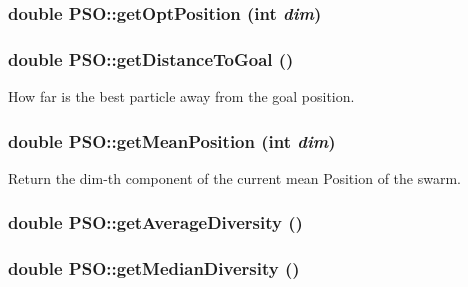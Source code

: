 \hypertarget{classPSO_520531a87cb937666bb07cd19543e43b}{
\subsubsection{\setlength{\rightskip}{0pt plus 5cm}double PSO::getOptPosition (int {\em dim})}}
\label{classPSO_520531a87cb937666bb07cd19543e43b}


\hypertarget{classPSO_6c8d9673578e234799b4f66605900eb3}{
\subsubsection{\setlength{\rightskip}{0pt plus 5cm}double PSO::getDistanceToGoal ()}}
\label{classPSO_6c8d9673578e234799b4f66605900eb3}


How far is the best particle away from the goal position. 

\hypertarget{classPSO_0bfc18361a99c875cd88c928accbd820}{
\subsubsection{\setlength{\rightskip}{0pt plus 5cm}double PSO::getMeanPosition (int {\em dim})}}
\label{classPSO_0bfc18361a99c875cd88c928accbd820}


Return the dim-th component of the current mean Position of the swarm. 

\hypertarget{classPSO_cfa32c9b4b8d07a56dc4a145fa5534fd}{
\subsubsection{\setlength{\rightskip}{0pt plus 5cm}double PSO::getAverageDiversity ()}}
\label{classPSO_cfa32c9b4b8d07a56dc4a145fa5534fd}


\hypertarget{classPSO_01973b6f01724ab7bee92341f10dfc76}{
\subsubsection{\setlength{\rightskip}{0pt plus 5cm}double PSO::getMedianDiversity ()}}
\label{classPSO_01973b6f01724ab7bee92341f10dfc76}



